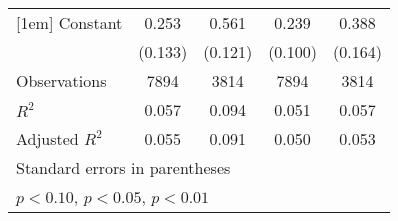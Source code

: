 \begin{table}[htbp]
\begin{tabular}{l*{4}{c}}
[1em]
Constant            &       0.253\sym{*}  &       0.561\sym{***}&       0.239\sym{**} &       0.388\sym{**} \\
                    &     (0.133)         &     (0.121)         &     (0.100)         &     (0.164)         \\
\hline
Observations        &        7894         &        3814         &        7894         &        3814         \\
\(R^{2}\)           &       0.057         &       0.094         &       0.051         &       0.057         \\
Adjusted \(R^{2}\)  &       0.055         &       0.091         &       0.050         &       0.053         \\
\hline\hline
\multicolumn{5}{l}{\footnotesize Standard errors in parentheses}\\
\multicolumn{5}{l}{\footnotesize \sym{*} \(p<0.10\), \sym{**} \(p<0.05\), \sym{***} \(p<0.01\)}\\
\end{tabular}
\end{table}
